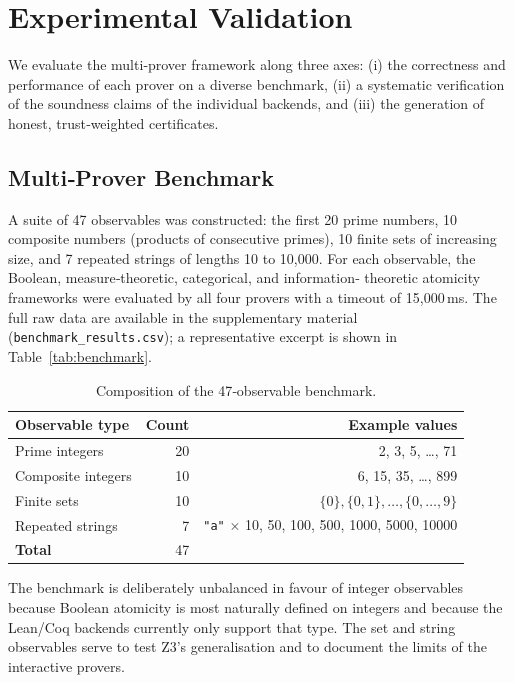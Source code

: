 \newpage
\section{Experimental Validation}

We evaluate the multi‑prover framework along three axes: (i) the correctness
and performance of each prover on a diverse benchmark, (ii) a systematic
verification of the soundness claims of the individual backends, and
(iii) the generation of honest, trust‑weighted certificates.

\subsection{Multi‑Prover Benchmark}

A suite of 47 observables was constructed: the first 20 prime numbers, 10
composite numbers (products of consecutive primes), 10 finite sets of
increasing size, and 7 repeated strings of lengths 10 to 10,000.  For each
observable, the Boolean, measure‑theoretic, categorical, and information‑
theoretic atomicity frameworks were evaluated by all four provers with a
timeout of 15,000\,ms.  The full raw data are available in the supplementary
material (\texttt{benchmark\_results.csv}); a representative excerpt is
shown in Table~\ref{tab:benchmark}.

\begin{table}[htbp]
\centering
\caption{Composition of the 47‑observable benchmark.}
\label{tab:benchmark_composition}
\begin{tabular}{l r r}
\toprule
\textbf{Observable type} & \textbf{Count} & \textbf{Example values} \\
\midrule
Prime integers        & 20 & 2, 3, 5, \dots, 71 \\
Composite integers    & 10 & 6, 15, 35, \dots, 899 \\
Finite sets           & 10 & $\{0\}, \{0,1\}, \dots, \{0,\dots,9\}$ \\
Repeated strings      &  7 & \texttt{"a"} $\times$ 10, 50, 100, 500, 1000, 5000, 10000 \\
\midrule
\textbf{Total}        & 47 & \\
\bottomrule
\end{tabular}
\end{table}

The benchmark is deliberately unbalanced in favour of integer
observables because Boolean atomicity is most naturally defined on
integers and because the Lean/Coq backends currently only support
that type.  The set and string observables serve to test Z3's
generalisation and to document the limits of the interactive provers.


